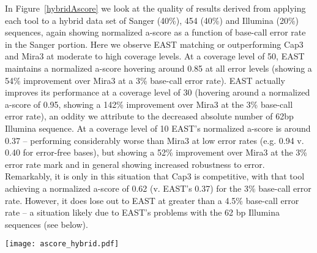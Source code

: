\documentclass{bioinfo}
\newcommand{\capthree} {{\small Cap3}}
\newcommand{\east} {{\small EAST}}
\newcommand{\mira}{{\small Mira3}}
\begin{document}
\vspace{3mm}

 In Figure~\ref{hybridAscore} we look at the
quality of results derived from applying each tool to a hybrid data
set of Sanger (40\%), 454 (40\%) and Illumina (20\%) sequences, again
showing normalized a-score as a function of base-call error rate in
the Sanger portion.  Here we observe \east\/ matching or outperforming
\capthree\/ and \mira\/ at moderate to high coverage levels.  At a coverage
level of 50, \east\/ maintains a normalized a-score hovering around
0.85 at all error levels (showing a 54\% improvement over \mira\/ at a
3\% base-call error rate).  \east\/ actually improves its performance
at a coverage level of 30 (hovering around a normalized a-score of
0.95, showing a 142\% improvement over \mira\/ at the 3\% base-call
error rate), an oddity we attribute to the decreased absolute number
of 62bp Illumina sequence.  At a coverage level of 10 \east's
normalized a-score is around 0.37 -- performing considerably worse
than \mira\/ at low error rates (e.g. 0.94 v. 0.40 for error-free
bases), but showing a 52\% improvement over \mira\/ at the 3\% error
rate mark and in general showing increased robustness to error.
Remarkably, it is only in this situation that \capthree\/ is
competitive, with that tool achieving a normalized a-score of 0.62
(v. \east's 0.37) for the 3\% base-call error rate.  However, it does
lose out to \east\/ at greater than a 4.5\% base-call error rate -- a
situation likely due to \east's problems with the 62 bp Illumina
sequences (see below).

\begin{figure*}[htb]
\centerline{\texttt{[image: ascore\_hybrid.pdf]}}
\caption{Comparative normalized a-scores for a hybrid set consisting
  of Sanger, 454 and Illumina sequence output, varying the base-call
  error rate for Sanger sequences and using the MetaSim default model
  for the 454 and Illumina sequences.  Each data set tested was
  composed of 40\% Sanger Sequences, 40\% 454 Sequences, and 20\%
  Illumina sequences.}
\label{hybridAscore}
\end{figure*}

\vspace{3mm}
\end{document}
